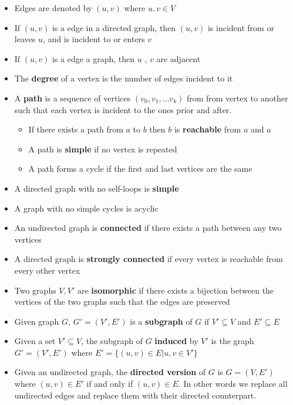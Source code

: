 \documentclass[../notes.tex]{subfiles}
\begin{document}
\begin{itemize}
	\item Edges are denoted by $ (u,v) $ where $ u,v \in V $
	\item If $ (u,v)$ is a edge in a directed graph, then $ (u,v) $ is incident from or leaves $ u $, and is incident to or enters $ v $ 
	\item If $ (u,v) $ is a edge a graph, then $ u$ , $ v $ are adjacent
	\item The \textbf{degree} of a vertex is the number of edges incident to it
	\item A \textbf{path} is a sequence of vertices $ (v_0, v_1, \ldots v_k) $ from from vertex to another such that each vertex is incident to the ones prior and after.
		\begin{itemize}
			\item If there exists a path from $ a $  to $ b $ then $ b $ is \textbf{reachable} from $ a $ and $ a $
			\item A path is \textbf{simple}  if no vertex is repeated
			\item A path forms a cycle if the first and last vertices are the same
		\end{itemize}
	\item A directed graph with no self-loops is \textbf{simple} 
	\item A graph with no simple cycles is acyclic
	\item An undirected graph is \textbf{connected} if there exists a path between any two vertices
	\item A directed graph is \textbf{strongly connected} if every vertex is reachable from every other vertex
	\item Two graphs $ V, V' $  are \textbf{isomorphic} if there exists a bijection between the vertices of the two graphs such that the edges are preserved
	\item Given graph $ G $,  $ G' = (V', E') $ is a \textbf{subgraph}  of $ G $  if $ V' \subseteq V $ and $ E' \subseteq E $
	\item Given a set $ V' \subseteq V $, the subgraph of $ G $ \textbf{induced} by $ V' $ is the graph $ G' = (V', E') $ where $ E' = \{ (u,v) \in E | u,v \in V' \} $
	\item Given an undirected graph, the \textbf{directed version} of $ G $ is $ G = (V, E') $  where $ (u,v) \in E' $ if and only if $ (u,v) \in E $. In other words we replace all undirected edges and replace them with their directed counterpart.

\end{itemize}
\end{document}
